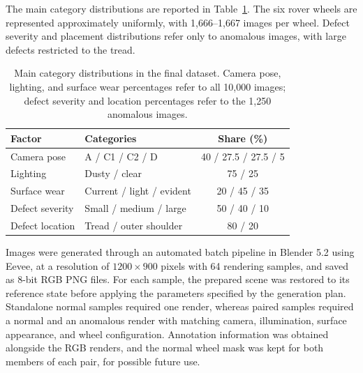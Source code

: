The main category distributions are reported in Table~\ref{tab:synthetic-category-distributions}. The six rover wheels are represented approximately uniformly, with 1,666--1,667 images per wheel. Defect severity and placement distributions refer only to anomalous images, with large defects restricted to the tread.

\begin{table}[ht!]
    \centering
    \begin{tabular}{@{}l l c@{}}
        \toprule
        \textbf{Factor} & \textbf{Categories}       & \textbf{Share (\%)}  \\
        \midrule
        \midrule
        Camera pose     & A / C1 / C2 / D           & 40 / 27.5 / 27.5 / 5 \\
        Lighting        & Dusty / clear             & 75 / 25              \\
        Surface wear    & Current / light / evident & 20 / 45 / 35         \\
        Defect severity & Small / medium / large    & 50 / 40 / 10         \\
        Defect location & Tread / outer shoulder    & 80 / 20              \\
        \bottomrule
    \end{tabular}
    \vspace{5mm}
    \caption{Main category distributions in the final dataset. Camera pose, lighting, and surface wear percentages refer to all 10,000 images; defect severity and location percentages refer to the 1,250 anomalous images.}
    \label{tab:synthetic-category-distributions}
\end{table}

Images were generated through an automated batch pipeline in Blender 5.2 using Eevee, at a resolution of \(1200 \times 900\) pixels with 64 rendering samples, and saved as 8-bit RGB PNG files. For each sample, the prepared scene was restored to its reference state before applying the parameters specified by the generation plan. Standalone normal samples required one render, whereas paired samples required a normal and an anomalous render with matching camera, illumination, surface appearance, and wheel configuration. Annotation information was obtained alongside the RGB renders, and the normal wheel mask was kept for both members of each pair, for possible future use.
